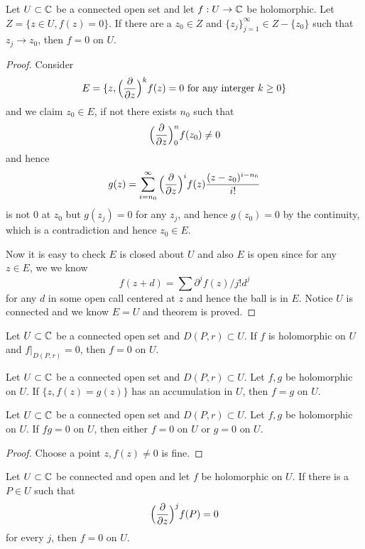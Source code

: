 \begin{theorem}
    Let $U\subset \mathbb{C}$ be a connected open set and let $f:U\to\mathbb{C}$ be holomorphic. Let $Z = \{z\in U, f(z) = 0\}$. If there are a $z_0\in Z$ and $\{z_j\}_{j=1}^{\infty} \in Z-\{z_0\}$ such that $z_j \to z_0$, then $f=0$ on $U$.
\end{theorem}
\begin{proof}\par
    Consider
    \[E = \{z, \Big(\dfrac{\partial}{\partial z}\Big)^kf(z) = 0\text{ for any interger } k\geq 0\}\]
    and we claim $z_0 \in E$, if not there exists $n_0$ such that
    \[
    \Big(\dfrac{\partial}{\partial z}\Big)^n_0 f(z_0) \neq 0
    \]
    and hence
    \[
    g(z) = \sum\limits_{i=n_0}^{\infty} \Big(\dfrac{\partial}{\partial z}\Big)^i f(z)\dfrac{(z-z_0)^{i-n_0}}{i!}
    \]
    is not $0$ at $z_0$ but $g(z_j) = 0$ for any $z_j$, and hence $g(z_0) = 0$ by the continuity, which is a contradiction and hence $z_0 \in E$.\par
    Now it is easy to check $E$ is closed about $U$ and also $E$ is open since for any $z\in E$, we we know
    \[
    f(z+d) = \sum \partial^{j}f(z)/j! d^j
    \]
    for any $d$ in some open call centered at $z$ and hence the ball is in $E$. Notice $U$ is connected and we know $E = U$ and theorem is proved.
\end{proof}

\begin{corollary}
    Let $U\subset \mathbb{C}$ be a connected open set and $D(P,r)\subset U$. If $f$ is holomorphic on $U$ and $f|_{D(P,r)} = 0$, then $f= 0$ on $U$.
\end{corollary}

\begin{corollary}
    Let $U\subset \mathbb{C}$ be a connected open set and $D(P,r)\subset U$. Let $f,g$ be holomorphic on $U$. If $\{z,f(z)=g(z)\}$ has an accumulation in $U$, then $f=g$ on $U$.
\end{corollary}

\begin{corollary}
    Let $U\subset \mathbb{C}$ be a connected open set and $D(P,r)\subset U$. Let $f,g$ be holomorphic on $U$. If $fg = 0$ on $U$, then either $f=0$ on $U$ or $g=0$ on $U$.
\end{corollary}
\begin{proof} Choose a point $z,f(z)\neq 0$ is fine.
\end{proof}

\begin{corollary}
    Let $U\subset\mathbb{C}$ be connected and open and let $f$ be holomorphic on $U$. If there is a $P\in U$ such that
    \[
    \Big(\dfrac{\partial}{\partial z}\Big)^j f(P) = 0
    \]
    for every $j$, then $f = 0$ on $U$.
\end{corollary}

